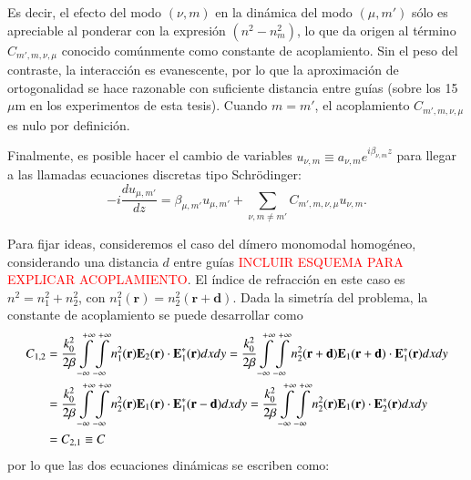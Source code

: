 Es decir, el efecto del modo $(\nu, m)$ en la dinámica del modo $(\mu, m')$ sólo es apreciable al ponderar con la expresión $(n^2 - n^2_{m})$, lo que da origen al término $C_{m', m, \nu, \mu}$ conocido comúnmente como constante de acoplamiento. Sin el peso del contraste, la interacción es evanescente, por lo que la aproximación de ortogonalidad se hace razonable con suficiente distancia entre guías (sobre los 15 $\mu$m en los experimentos de esta tesis). Cuando $m=m'$, el acoplamiento $C_{m', m, \nu, \mu}$ es nulo por definición.

Finalmente, es posible hacer el cambio de variables $u_{\nu, m} \equiv a_{\nu, m} e^{i\beta_{\nu, m} z}$ para llegar a las llamadas ecuaciones discretas tipo Schrödinger:
\begin{equation}
	  	 -i\frac{d u_{\mu, m'}}{dz} = \beta_{\mu, m'} u_{\mu, m'} + \sum_{\nu, m\neq m'}C_{m', m, \nu, \mu}   u_{\nu, m}.
	\label{eqn:CMT1}
\end{equation}



Para fijar ideas, consideremos el caso del dímero monomodal homogéneo, considerando una distancia $d$ entre guías \textcolor{red}{INCLUIR ESQUEMA PARA EXPLICAR ACOPLAMIENTO}. El índice de refracción en este caso es $n^2 = n_1^2 + n_2^2$, con $n_1^2(\textbf{r})=n_2^2(\textbf{r}+\textbf{d})$. Dada la simetría del problema, la constante de acoplamiento se puede desarrollar como 
\begin{align}
	C_{1, 2} &=  \frac{k_0^2}{2\beta}\int\displaylimits_{-\infty}^{+\infty}\int\displaylimits_{-\infty}^{+\infty}  n_1^2(\textbf{r}) \textbf{E}_{2}(\textbf{r}) \cdot \textbf{E}_{1}^*(\textbf{r}) dxdy 
	= \frac{k_0^2}{2\beta}\int\displaylimits_{-\infty}^{+\infty}\int\displaylimits_{-\infty}^{+\infty}  n_2^2(\textbf{r}+\textbf{d}) \textbf{E}_{1}(\textbf{r}+\textbf{d}) \cdot \textbf{E}_{1}^*(\textbf{r}) dxdy 
	\nonumber	
	\\	
	&= \frac{k_0^2}{2\beta}\int\displaylimits_{-\infty}^{+\infty}\int\displaylimits_{-\infty}^{+\infty} n_2^2(\textbf{r}) \textbf{E}_{1}(\textbf{r}) \cdot \textbf{E}_{1}^*(\textbf{r}-\textbf{d}) dxdy 
	= \frac{k_0^2}{2\beta}\int\displaylimits_{-\infty}^{+\infty}\int\displaylimits_{-\infty}^{+\infty} n_2^2(\textbf{r}) \textbf{E}_{1}(\textbf{r}) \cdot \textbf{E}_{2}^*(\textbf{r}) dxdy 
	\nonumber
	\\	
	&= C_{2,1} \equiv C
	\nonumber
\end{align}
 por lo que las dos ecuaciones dinámicas se escriben como:

